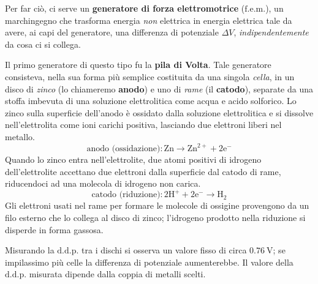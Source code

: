 Per far ciò, ci serve un \textbf{generatore di forza elettromotrice} ($\mathrm{f.e.m.}$), un marchingegno che trasforma energia \textit{non} elettrica in energia elettrica tale da avere, ai capi del generatore, una differenza di potenziale $\Delta V$, \textit{indipendentemente} da cosa ci si collega.
\begin{digressionwt}
	Il primo generatore di questo tipo fu la \textbf{pila di Volta}. Tale generatore consisteva, nella sua forma più semplice costituita da una singola \textit{cella}, in un disco di \textit{zinco} (lo chiameremo \textbf{anodo}) e uno di \textit{rame} (il \textbf{catodo}), separate da una stoffa imbevuta di una soluzione elettrolitica come acqua e acido solforico.
	Lo zinco sulla superficie dell'anodo è ossidato dalla soluzione elettrolitica e si dissolve nell'elettrolita come ioni carichi positiva, lasciando due elettroni liberi nel metallo.
	\begin{equation*}
		\text{anodo (ossidazione)}\colon \mathrm{Zn}\to\mathrm{Zn}^{2+}+2\mathrm{e}^{-}
	\end{equation*}
	Quando lo zinco entra nell'elettrolite, due atomi positivi di idrogeno dell'elettrolite accettano due elettroni dalla superficie dal catodo di rame, riducendoci ad una molecola di idrogeno non carica.
	\begin{equation*}
		\text{catodo (riduzione)}\colon2\mathrm{H}^{+}+2\mathrm{e}^{-}\to\mathrm{H}_2
	\end{equation*}
	Gli elettroni usati nel rame per formare le molecole di ossigine provengono da un filo esterno che lo collega al disco di zinco; l'idrogeno prodotto nella riduzione si disperde in forma gassosa.

	Misurando la $\mathrm{d.d.p.}$ tra i dischi si osserva un valore fisso di circa $\SI{0,76}{\volt}$; se impilassimo più celle la differenza di potenziale aumenterebbe. Il valore della  $\mathrm{d.d.p.}$ misurata dipende dalla coppia di metalli scelti.
\end{digressionwt}
